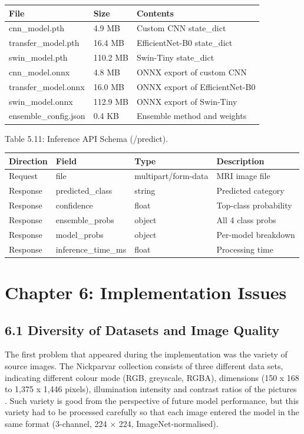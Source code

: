 \documentclass[12pt,a4paper,oneside]{report}
\begin{document}
\begin{center}
\small
\begin{tabularx}{\textwidth}{YYY}
\toprule
\textbf{File} & \textbf{Size} & \textbf{Contents} \\
\midrule
cnn\_model.pth & 4.9 MB & Custom CNN state\_dict \\
transfer\_model.pth & 16.4 MB & EfficientNet-B0 state\_dict \\
swin\_model.pth & 110.2 MB & Swin-Tiny state\_dict \\
cnn\_model.onnx & 4.8 MB & ONNX export of custom CNN \\
transfer\_model.onnx & 16.0 MB & ONNX export of EfficientNet-B0 \\
swin\_model.onnx & 112.9 MB & ONNX export of Swin-Tiny \\
ensemble\_config.json & 0.4 KB & Ensemble method and weights \\
\bottomrule
\end{tabularx}
\end{center}
Table 5.11: Inference API Schema (/predict).
\begin{center}
\small
\begin{tabularx}{\textwidth}{YYYY}
\toprule
\textbf{Direction} & \textbf{Field} & \textbf{Type} & \textbf{Description} \\
\midrule
Request & file & multipart/form-data & MRI image file \\
Response & predicted\_class & string & Predicted category \\
Response & confidence & float & Top-class probability \\
Response & ensemble\_probs & object & All 4 class probs \\
Response & model\_probs & object & Per-model breakdown \\
Response & inference\_time\_ms & float & Processing time \\
\bottomrule
\end{tabularx}
\end{center}
\chapter{Chapter 6: Implementation Issues}
\section{6.1 Diversity of Datasets and Image Quality}
The first problem that appeared during the implementation was the variety of source images. The Nickparvar collection consists of three different data sets, indicating different colour mode (RGB, greyscale, RGBA), dimensions (150 x 168 to 1,375 x 1,446 pixels), illumination intensity and contrast ratios of the pictures . Such variety is good from the perspective of future model performance, but this variety had to be processed carefully so that each image entered the model in the same format (3-channel, 224 × 224, ImageNet-normalised).
\end{document}
